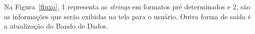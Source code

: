 \documentclass[12pt,a4paper]{article}
\begin{document}
Na Figura~\ref{fluxo}, 1 representa as \textit{strings} em formatos pré determinados e 2, são as informações que serão exibidas na tela para o usuário. Outra forma de saída é a atualização do Bando de Dados.
\end{document}
